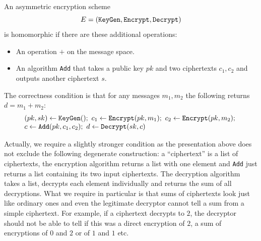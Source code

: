 \documentclass[envcountsame]{llncs}
\newcommand{\alg}[1]{\textup{\texttt{#1}}}
\begin{document}
\begin{definition}
An asymmetric encryption scheme
\[ E = \left(\alg{KeyGen}, \alg{Encrypt}, \alg{Decrypt}\right)\]
is homomorphic if there are these additional operations:

\begin{itemize}
\item An operation $+$ on the message space.
\item An algorithm \alg{Add} that takes a public key $pk$ and two ciphertexts
$c_1, c_2$ and outputs another ciphertext $s$.
\end{itemize}

The correctness condition is that for any messages $m_1, m_2$ the following returns $d = m_1 + m_2$:
\[
\begin{array}{l}
(pk, sk) \gets \alg{KeyGen}();\ %
c_1 \gets \alg{Encrypt}(pk, m_1);\ %
c_2 \gets \alg{Encrypt}(pk, m_2);\ \\
c \gets \alg{Add}(pk, c_1, c_2);\ %
d \gets \alg{Decrypt}(sk, c)
\end{array}
\]
\end{definition}

Actually, we require a slightly stronger condition as the presentation above
does not exclude the following degenerate construction: a ``ciphertext'' is a
list of ciphertexts, the encryption algorithm returns a list with one element
and \alg{Add} just returns a list containing its two input ciphertexts. The
decryption algorithm takes a list, decrypts each element individually and
returns the sum of all decryptions. What we require in particular is that sums
of ciphertexts look just like ordinary ones and even the legitimate decryptor
cannot tell a sum from a simple ciphertext. For example, if a ciphertext
decrypts to $2$, the decryptor should not be able to tell if this was a direct
encryption of $2$, a sum of encryptions of $0$ and $2$ or of $1$ and $1$ etc.
\end{document}
